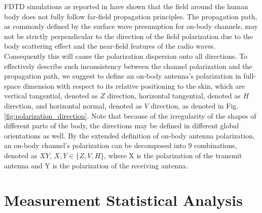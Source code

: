 \documentclass[conference]{IEEEtran}
\begin{document}
FDTD simulations as reported in \cite{} have shown that the field around the human body does not fully follow far-field propagation principles. The propagation path, as commonly defined by the surface wave presumption for on-body channels, may not be strictly perpendicular to the direction of the field polarization due to the body scattering effect and the near-field features of the radio waves. Consequently this will cause the polarization dispersion onto all directions. To effectively describe such inconsistency between the channel polarization and the propagation path, we suggest to define an on-body antenna's polarization in full-space dimension with respect to its relative positioning to the skin, which are vertical tangential, denoted as $Z$ direction, horizontal tangential, denoted as $H$ direction, and horizontal normal, denoted as $V$ direction, as denoted in Fig. \ref{fig:polarization_direction}. Note that because of the irregularity of the shapes of different parts of the body, the directions may be defined in different global orientations as well. By the extended definition of on-body antenna polarization, an on-body channel's polarization can be decomposed into 9 combinations, denoted as $XY$, $X, Y \in \{Z,V,H\}$, where X is the polarization of the transmit antenna and Y is the polarization of the receiving antenna.

\section{Measurement Statistical Analysis}\label{sec:analysis}

\begin{table}[!t]
\centering
\captionsetup{labelsep=newline}
\caption{Path loss summary of measurements [dB]}
\label{tab:2}
\end{table}
\end{document}
